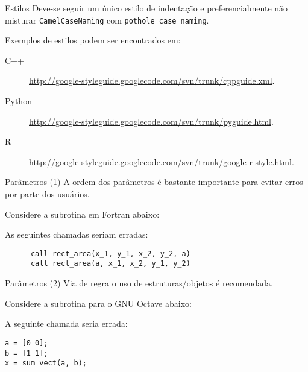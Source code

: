 \documentclass[11pt]{beamer}
\begin{document}
\begin{frame}[fragile]{Estilos}
    Deve-se seguir um único estilo de indentação e preferencialmente não
    misturar \verb+CamelCaseNaming+ com \verb+pothole_case_naming+.

    Exemplos de estilos podem ser encontrados em:
    \begin{description}
        \item[C++]
            \url{http://google-styleguide.googlecode.com/svn/trunk/cppguide.xml}.
        \item[Python]
            \url{http://google-styleguide.googlecode.com/svn/trunk/pyguide.html}.
        \item[R]
            \url{http://google-styleguide.googlecode.com/svn/trunk/google-r-style.html}.
    \end{description}
\end{frame}

\begin{frame}[fragile]{Parâmetros (1)}
    A ordem dos parâmetros é bastante importante para evitar erros por parte
    dos usuários.
    \pause
    \begin{example}
        Considere a subrotina em Fortran abaixo:
        
        As seguintes chamadas seriam erradas:
        \begin{lstlisting}
      call rect_area(x_1, y_1, x_2, y_2, a)
      call rect_area(a, x_1, x_2, y_1, y_2)
        \end{lstlisting}
    \end{example}
\end{frame}

\begin{frame}[fragile]{Parâmetros (2)}
    Via de regra o uso de estruturas/objetos é recomendada.
    \pause
    \begin{example}
        Considere a subrotina para o GNU Octave abaixo:
        
        A seguinte chamada seria errada:
        \begin{lstlisting}
a = [0 0];
b = [1 1];
x = sum_vect(a, b);
        \end{lstlisting}
    \end{example}
\end{frame}
\end{document}
